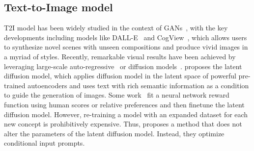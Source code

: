 \subsection{Text-to-Image model}
T2I model has been widely studied in the context of GANs~\cite{goodfellow2020generative}, with the key developments including models like DALL-E~\cite{ramesh2021zero} and CogView~\cite{ding2021cogview}, which allows users to synthesize novel scenes with unseen compositions and produce vivid images in a myriad of styles.
Recently, remarkable visual results have been achieved by leveraging large-scale auto-regressive~\cite{ramesh2021zero} or diffusion models~\cite{nichol2021glide}. 
\cite{rombach2022high} proposes the latent diffusion model, which applies diffusion model in the latent space of powerful pre-trained autoencoders and uses text with rich semantic information as a condition to guide the generation of images. 
Some work~\cite{clark2023directly, xu2024imagereward} fit a neural network reward function using human scores or relative preferences and then finetune the latent diffusion model.
However, re-training a model with an expanded dataset for each new concept is prohibitively expensive. 
Thus, \cite{gal2022image} proposes a method that does not alter the parameters of the latent diffusion model. Instead, they optimize conditional input prompts.
